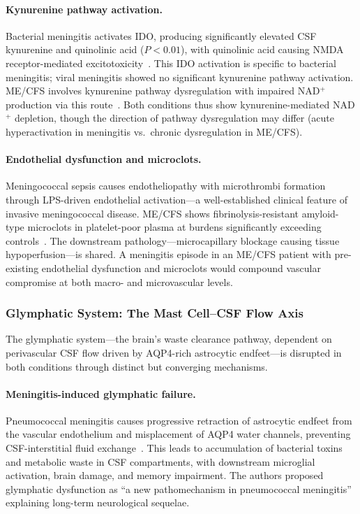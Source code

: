 \paragraph{Kynurenine pathway activation.}
Bacterial meningitis activates IDO, producing significantly elevated CSF kynurenine and quinolinic acid ($P<0.01$), with quinolinic acid causing NMDA receptor-mediated excitotoxicity~\cite{Midtbo2014meningitis}. This IDO activation is specific to bacterial meningitis; viral meningitis showed no significant kynurenine pathway activation. ME/CFS involves kynurenine pathway dysregulation with impaired NAD$^+$ production via this route~\cite{Kavyani2022kynurenine,Dehhaghi2022kynurenine}. Both conditions thus show kynurenine-mediated NAD$^+$ depletion, though the direction of pathway dysregulation may differ (acute hyperactivation in meningitis vs.\ chronic dysregulation in ME/CFS).

\paragraph{Endothelial dysfunction and microclots.}
Meningococcal sepsis causes endotheliopathy with microthrombi formation through LPS-driven endothelial activation---a well-established clinical feature of invasive meningococcal disease. ME/CFS shows fibrinolysis-resistant amyloid-type microclots in platelet-poor plasma at burdens significantly exceeding controls~\cite{VanderLinden2023microclots}. The downstream pathology---microcapillary blockage causing tissue hypoperfusion---is shared. A meningitis episode in an ME/CFS patient with pre-existing endothelial dysfunction and microclots would compound vascular compromise at both macro- and microvascular levels.

\subsubsection{Glymphatic System: The Mast Cell--CSF Flow Axis}
\label{sec:glymphatic-meningitis}

The glymphatic system---the brain's waste clearance pathway, dependent on perivascular CSF flow driven by AQP4-rich astrocytic endfeet---is disrupted in both conditions through distinct but converging mechanisms.

\paragraph{Meningitis-induced glymphatic failure.}
Pneumococcal meningitis causes progressive retraction of astrocytic endfeet from the vascular endothelium and misplacement of AQP4 water channels, preventing CSF-interstitial fluid exchange~\cite{Pinas2022glymphatic}. This leads to accumulation of bacterial toxins and metabolic waste in CSF compartments, with downstream microglial activation, brain damage, and memory impairment. The authors proposed glymphatic dysfunction as ``a new pathomechanism in pneumococcal meningitis'' explaining long-term neurological sequelae.

